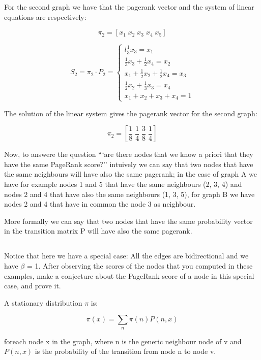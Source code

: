 \documentclass{article}
\begin{document}
For the second graph we have that the pagerank vector and the system of linear equations are respectively:

$$
\pi_{2} = \left[ x_{1} \; x_{2} \; x_{3} \; x_{4} \; x_{5} \right]
$$

$$
S_{2} = \pi_{2} \cdot P_{2} =
\begin{cases}{l}
\frac{1}{3}x_{3}  =   x_{1}   \\
\frac{1}{3}x_{3} + \frac{1}{2}x_{4}  =   x_{2}   \\
x_{1} + \frac{1}{2}x_{2} + \frac{1}{2}x_{4} =  x_{3}  \\
\frac{1}{2}x_{2} + \frac{1}{3}x_{3}  =   x_{4}   \\
x_{1} + x_{2} + x_{3} + x_{4}  = 1
\end{cases}
$$


The solution of the linear system gives the pagerank vector for the second graph:


$$\pi_{2} = \left[ \frac{1}{8} \; \frac{1}{4} \; \frac{3}{8} \; \frac{1}{4} \right]$$


Now, to answere the question ```are there nodes that we know a priori that they have the same PageRank score?'' intuively we can say that two nodes that have the same neighbours will have also the same pagerank; in the case of graph A we have for example nodes 1 and 5 that have the same neighbours (2, 3, 4) and nodes 2 and 4 that have also the same neighbours (1, 3, 5), for graph B we have nodes 2 and 4 that have in common the node 3 as neighbour.

More formally we can say that two nodes that have the same probability vector in the transition matrix P will have also the same pagerank.




\subsection{}
Notice that here we have a special case: All the edges are bidirectional and we have $\beta$ = 1. After observing the scores of the nodes that you computed in these examples, make a conjecture about the PageRank score of a node in this special case, and prove it.


A stationary distribution $\pi$ is:

\begin{equation}\label{eq:stationary1}
\pi(x) = \sum_{n} \pi(n) P(n,x)          
\end{equation}

foreach node x in the graph, where n is the generic neighbour node of v and $P(n,x)$ is the probability of the transition from node n to node v.
\end{document}
